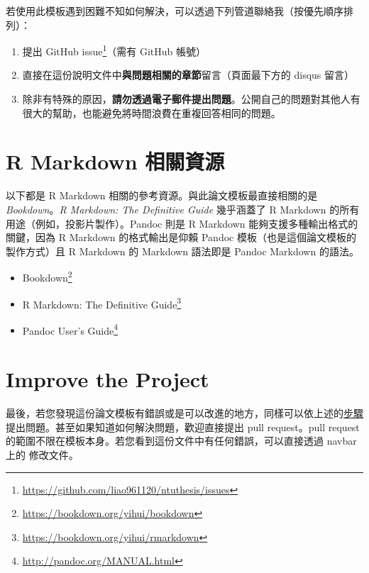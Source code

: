 \documentclass[oneside]{book}
\renewcommand{\href}[2]{#2\footnote{\url{#1}}}
\providecommand{\tightlist}{%
  \setlength{\itemsep}{0pt}\setlength{\parskip}{0pt}}
\theoremstyle{definition}
\theoremstyle{definition}
\theoremstyle{definition}
\theoremstyle{remark}
\begin{document}
若使用此模板遇到困難不知如何解決，可以透過下列管道聯絡我（按優先順序排列）：

\begin{enumerate}
\def\labelenumi{\arabic{enumi}.}
\tightlist
\item
  提出 \href{https://github.com/liao961120/ntuthesis/issues}{GitHub issue}（需有 GitHub 帳號）
\item
  直接在這份說明文件中\textbf{與問題相關的章節}留言（頁面最下方的 disqus 留言）
\item
  除非有特殊的原因，\textbf{請勿透過電子郵件提出問題}。公開自己的問題對其他人有很大的幫助，也能避免將時間浪費在重複回答相同的問題。
\end{enumerate}

\hypertarget{rmd-resources}{%
\section*{R Markdown 相關資源}\label{rmd-resources}}

以下都是 R Markdown 相關的參考資源。與此論文模板最直接相關的是 \emph{Bookdown}。\emph{R Markdown: The Definitive Guide} 幾乎涵蓋了 R Markdown 的所有用途（例如，投影片製作）。Pandoc 則是 R Markdown 能夠支援多種輸出格式的關鍵，因為 R Markdown 的格式輸出是仰賴 Pandoc 模板（也是這個論文模板的製作方式）且 R Markdown 的 Markdown 語法即是 Pandoc Markdown 的語法。

\begin{itemize}
\item
  \href{https://bookdown.org/yihui/bookdown}{Bookdown}
\item
  \href{https://bookdown.org/yihui/rmarkdown}{R Markdown: The Definitive Guide}
\item
  \href{http://pandoc.org/MANUAL.html}{Pandoc User's Guide}
\end{itemize}

\hypertarget{improve-the-project}{%
\section*{Improve the Project}\label{improve-the-project}}

最後，若您發現這份論文模板有錯誤或是可以改進的地方，同樣可以依上述的\protect\hyperlink{issue}{步驟}提出問題。甚至如果知道如何解決問題，歡迎直接提出 pull request。pull request 的範圍不限在模板本身。若您看到這份文件中有任何錯誤，可以直接透過 navbar 上的 修改文件。
\end{document}
